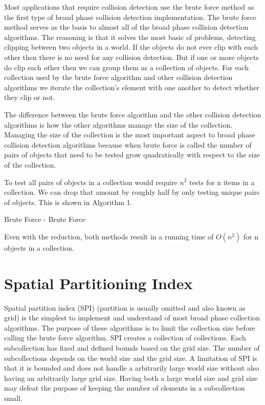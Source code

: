 \documentclass[conference]{IEEEtran}
\begin{document}
Most applications that require collision detection use the brute force method as the first type of broad phase collision detection implementation. The brute force method serves as the basis to almost all of the broad phase collision detection algorithms. The reasoning is that it solves the most basic of problems, detecting clipping between two objects in a world. If the objects do not ever clip with each other then there is no need for any collision detection. But if one or more objects do clip each other then we can group them as a collection of objects. For each collection used by the brute force algorithm and other collision detection algorithms we iterate the collection's element with one another to detect whether they clip or not.

The difference between the brute force algorithm and the other collision detection algorithms is how the other algorithms manage the size of the collection. Managing the size of the collection is the most important aspect to broad phase collision detection algorithms because when brute force is called the number of pairs of objects that need to be tested grow quadratically with respect to the size of the collection.

To test all pairs of objects in a collection would require $n^{2}$ tests for n items in a collection. We can drop that amount by roughly half by only testing unique pairs of objects. This is shown in Algorithm 1.

\begin{algorithm}
\caption{Brute Force - Brute Force}
\begin{algorithmic}[1]
                        \State {}
                \EndFor
        \EndFor
\EndFunction
\end{algorithmic}
\end{algorithm}

Even with the reduction, both methods result in a running time of $O(n^{2})$ for n objects in a collection.

\section{Spatial Partitioning Index}

Spatial partition index (SPI) (partition is usually omitted and also known as grid) is the simplest to implement and understand of most broad phase collection algorithms. The purpose of these algorithms is to limit the collection size before calling the brute force algorithm. SPI creates a collection of collections. Each subcollection has fixed and defined bounds based on the grid size. The number of subcollections depends on the world size and the grid size. A limitation of SPI is that it is bounded and does not handle a arbitrarily large world size without also having an arbitrarily large grid size. Having both a large world size and grid size may defeat the purpose of keeping the number of elements in a subcollection small.
\end{document}
